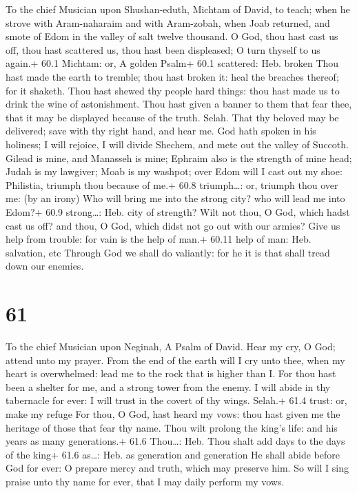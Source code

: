 To the chief Musician upon Shushan-eduth, Michtam of David, to teach;
when he strove with Aram-naharaim and with Aram-zobah, when Joab
returned, and smote of Edom in the valley of salt twelve thousand.
 O God, thou hast cast us off, thou hast scattered us, thou
hast been displeased; O turn thyself to us again.+ 60.1 Michtam: or, A
golden Psalm+ 60.1 scattered: Heb. broken  Thou hast made
the earth to tremble; thou hast broken it: heal the breaches thereof;
for it shaketh.  Thou hast shewed thy people hard things:
thou hast made us to drink the wine of astonishment.  Thou
hast given a banner to them that fear thee, that it may be displayed
because of the truth. Selah.  That thy beloved may be
delivered; save with thy right hand, and hear me.  God hath
spoken in his holiness; I will rejoice, I will divide Shechem, and mete
out the valley of Succoth.  Gilead is mine, and Manasseh is
mine; Ephraim also is the strength of mine head; Judah is my lawgiver;
 Moab is my washpot; over Edom will I cast out my shoe:
Philistia, triumph thou because of me.+ 60.8 triumph\ldots: or, triumph
thou over me: (by an irony)  Who will bring me into the
strong city? who will lead me into Edom?+ 60.9 strong\ldots: Heb. city
of strength?  Wilt not thou, O God, which hadst cast us
off? and thou, O God, which didst not go out with our armies?
 Give us help from trouble: for vain is the help of man.+
60.11 help of man: Heb. salvation, etc  Through God we
shall do valiantly: for he it is that shall tread down our enemies.

\hypertarget{section-60}{%
\section{61}\label{section-60}}

To the chief Musician upon Neginah, A Psalm of David.  Hear
my cry, O God; attend unto my prayer.  From the end of the
earth will I cry unto thee, when my heart is overwhelmed: lead me to the
rock that is higher than I.  For thou hast been a shelter
for me, and a strong tower from the enemy.  I will abide in
thy tabernacle for ever: I will trust in the covert of thy wings.
Selah.+ 61.4 trust: or, make my refuge  For thou, O God,
hast heard my vows: thou hast given me the heritage of those that fear
thy name.  Thou wilt prolong the king's life: and his years
as many generations.+ 61.6 Thou\ldots: Heb. Thou shalt add days to the
days of the king+ 61.6 as\ldots: Heb. as generation and generation
 He shall abide before God for ever: O prepare mercy and
truth, which may preserve him.  So will I sing praise unto
thy name for ever, that I may daily perform my vows.

